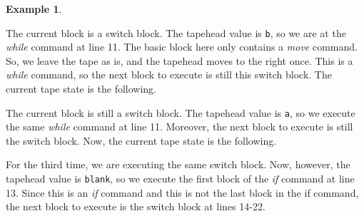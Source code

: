 \documentclass{article}
\theoremstyle{definition}
\newtheorem{example}[rules]{Example}
\theoremstyle{plain}
\begin{document}
\begin{example}
\begin{figure}[H]
    \end{figure}
    \noindent The current block is a switch block. The tapehead value is \texttt{b}, so we are at the \textit{while} command at line 11. The basic block here only contains a \textit{move} command. So, we leave the tape as is, and the tapehead moves to the right once. This is a \textit{while} command, so the next block to execute is still this switch block. The current tape state is the following.
    \begin{figure}[H]
        \centering
    \end{figure}
    \noindent The current block is still a switch block. The tapehead value is \texttt{a}, so we execute the same \textit{while} command at line 11. Moreover, the next block to execute is still the switch block. Now, the current tape state is the following.
    \begin{figure}[H]
        \centering
    \end{figure}
    \noindent For the third time, we are executing the same switch block. Now, however, the tapehead value is \texttt{blank}, so we execute the first block of the \textit{if} command at line 13. Since this is an \textit{if} command and this is not the last block in the if command, the next block to execute is the switch block at lines 14-22.
    \begin{figure}[H]
        \centering
\end{figure}
\end{example}
\end{document}
